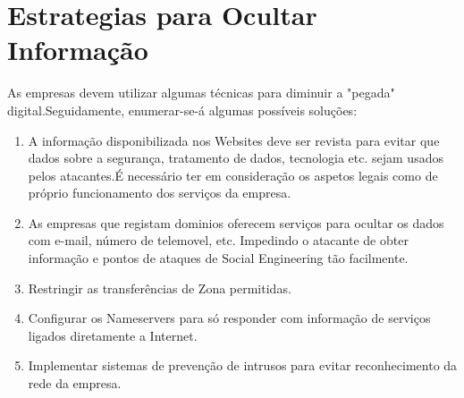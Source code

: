 \section{Estrategias para Ocultar Informação}

As empresas devem utilizar algumas técnicas para diminuir a "pegada" digital.Seguidamente, enumerar-se-á algumas possíveis soluções:

\begin{enumerate}

\item A informação disponibilizada nos Websites deve ser revista para evitar que dados sobre a segurança, tratamento de dados, tecnologia etc. sejam usados pelos atacantes.É necessário ter em consideração os aspetos legais como de próprio funcionamento dos serviços da empresa.
\newline
\item As empresas que registam dominios oferecem serviços para ocultar os dados com e-mail, número de telemovel, etc. Impedindo o atacante de obter informação e pontos de ataques de Social Engineering tão facilmente.
\newline
\item Restringir as transferências de Zona permitidas.
\newline
\item Configurar os Nameservers para só responder com informação de serviços ligados diretamente a Internet.
\newline
\item Implementar sistemas de prevenção de intrusos para evitar reconhecimento da rede da empresa.

\end{enumerate}

